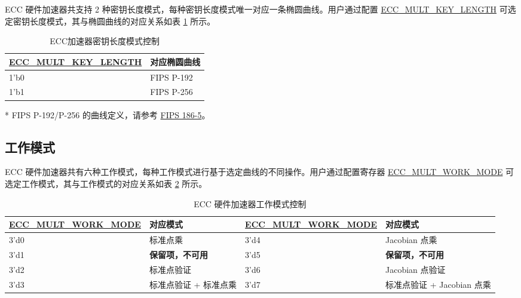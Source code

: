 \documentclass[main\_\_CN.tex]{subfiles}
\begin{document}
\chipname{} ECC 硬件加速器共支持 2 种密钥长度模式，每种密钥长度模式唯一对应一条椭圆曲线。用户通过配置 \hyperref[fielddesc:ECCMULTKEYLENGTH]{ECC\_MULT\_KEY\_LENGTH} 可选定密钥长度模式，其与椭圆曲线的对应关系如表 \ref{tab:ecc-key-length} 所示。
\begin{table}[H]
    \centering
    \caption{ECC加速器密钥长度模式控制}
    \label{tab:ecc-key-length}
    \begin{threeparttable}
    \begin{tabular}{|p{4.2cm}|p{3.6cm}|}
    \hline
        \rowcolor{lightgray}
        \textbf{\hyperref[fielddesc:ECCMULTKEYLENGTH]{ECC\_MULT\_KEY\_LENGTH}} & \textbf{对应椭圆曲线\tnote{*}} \\ \hline
        1'b0 & FIPS P-192  \\\hline
        1'b1 & FIPS P-256  \\\hline
    \end{tabular}
    \begin{tablenotes}
        \item[*] FIPS P-192/P-256 的曲线定义，请参考 \href{https://nvlpubs.nist.gov/nistpubs/FIPS/NIST.FIPS.186-5.pdf}{FIPS 186-5}。

    \end{tablenotes}
    \end{threeparttable}
\end{table}

\subsection{工作模式}

\chipname{} ECC 硬件加速器共有六种工作模式，每种工作模式进行基于选定曲线的不同操作。用户通过配置寄存器 \hyperref[fielddesc:ECCMULTWORKMODE]{ECC\_MULT\_WORK\_MODE} 可选定工作模式，其与工作模式的对应关系如表 \ref{tab:ecc-work-mode} 所示。

\begin{table}[H]
    \centering
    \caption{ECC 硬件加速器工作模式控制}
    \label{tab:ecc-work-mode}
    \begin{tabular}{|l|l|l|l|}
    \hline
        \rowcolor{lightgray}
        \textbf{\hyperref[fielddesc:ECCMULTWORKMODE]{ECC\_MULT\_WORK\_MODE}} & \textbf{对应模式} & \textbf{\hyperref[fielddesc:ECCMULTWORKMODE]{ECC\_MULT\_WORK\_MODE}} & \textbf{对应模式} \\ \hline
        3'd0 & 标准点乘                & 3'd4 & Jacobian 点乘            \\\hline
        3'd1 & \textbf{保留项，不可用} & 3'd5 & \textbf{保留项，不可用}  \\\hline
        3'd2 & 标准点验证              & 3'd6 & Jacobian 点验证          \\\hline
        3'd3 & 标准点验证 + 标准点乘     & 3'd7 & 标准点验证 + Jacobian 点乘  \\\hline
    \end{tabular}
\end{table}
\end{document}
